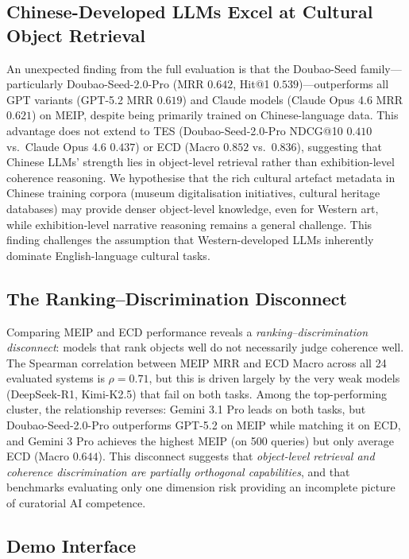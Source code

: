 \documentclass[11pt]{article}
\begin{document}
\subsection{Chinese-Developed LLMs Excel at Cultural Object Retrieval}
\label{sec:chinese-llm}

An unexpected finding from the full evaluation is that the
Doubao-Seed family---particularly Doubao-Seed-2.0-Pro
(MRR $0.642$, Hit@1 $0.539$)---outperforms all GPT variants
(GPT-5.2 MRR $0.619$) and Claude models
(Claude Opus 4.6 MRR $0.621$) on MEIP, despite being primarily
trained on Chinese-language data.
This advantage does not extend to TES (Doubao-Seed-2.0-Pro NDCG@10 $0.410$
vs.\ Claude Opus 4.6 $0.437$) or ECD (Macro $0.852$ vs.\ $0.836$),
suggesting that Chinese LLMs' strength lies in object-level
retrieval rather than exhibition-level coherence reasoning.
We hypothesise that the rich cultural artefact metadata in Chinese
training corpora (museum digitalisation initiatives, cultural heritage
databases) may provide denser object-level knowledge, even for Western art,
while exhibition-level narrative reasoning remains a general challenge.
This finding challenges the assumption that Western-developed LLMs
inherently dominate English-language cultural tasks.

\subsection{The Ranking--Discrimination Disconnect}
\label{sec:rank-disc}

Comparing MEIP and ECD performance reveals a \emph{ranking--discrimination
disconnect}: models that rank objects well do not necessarily judge
coherence well.
The Spearman correlation between MEIP MRR and ECD Macro across all
24 evaluated systems is $\rho = 0.71$, but this is driven largely by
the very weak models (DeepSeek-R1, Kimi-K2.5) that fail on both tasks.
Among the top-performing cluster, the relationship reverses:
Gemini 3.1 Pro leads on both tasks, but Doubao-Seed-2.0-Pro
outperforms GPT-5.2 on MEIP while matching it on ECD,
and Gemini 3 Pro achieves the highest MEIP (on 500 queries)
but only average ECD (Macro $0.644$).
This disconnect suggests that \emph{object-level retrieval and
coherence discrimination are partially orthogonal capabilities},
and that benchmarks evaluating only one dimension risk providing
an incomplete picture of curatorial AI competence.

\subsection{Demo Interface}
\label{sec:demo}
\end{document}
